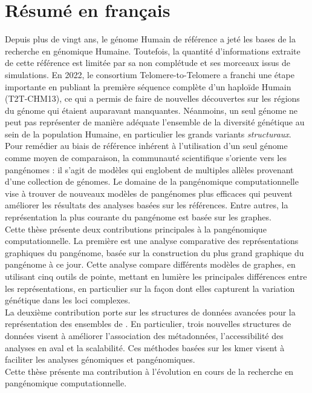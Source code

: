 \section{Résumé en français}
Depuis plus de vingt ans, le génome Humain de référence a jeté les bases de la recherche en génomique Humaine. Toutefois, la quantité d'informations extraite de cette référence est limitée par sa non complétude et ses morceaux issus de simulations. En 2022, le consortium Telomere-to-Telomere a franchi une étape importante en publiant la première séquence complète d'un haploïde Humain (T2T-CHM13), ce qui a permis de faire de nouvelles découvertes sur les régions du génome qui étaient auparavant manquantes. Néanmoins, un seul génome ne peut pas représenter de manière adéquate l'ensemble de la diversité génétique au sein de la population Humaine, en particulier les grands variants \emph{structuraux}.\\
Pour remédier au biais de référence inhérent à l'utilisation d'un seul génome comme moyen de comparaison, la communauté scientifique s'oriente vers les pangénomes : il s'agit de modèles qui englobent de multiples allèles provenant d'une collection de génomes. Le domaine de la pangénomique computationnelle vise à trouver de nouveaux modèles de pangénomes plus efficaces qui peuvent améliorer les résultats des analyses basées sur les références. Entre autres, la représentation la plus courante du pangénome est basée sur les graphes.\\
Cette thèse présente deux contributions principales à la pangénomique computationnelle. La première est une analyse comparative des représentations graphiques du pangénome, basée sur la construction du plus grand graphique du pangénome à ce jour. Cette analyse compare différents modèles de graphes, en utilisant cinq outils de pointe, mettant en lumière les principales différences entre les représentations, en particulier sur la façon dont elles capturent la variation génétique dans les loci complexes.\\
La deuxième contribution porte sur les structures de données avancées pour la représentation des ensembles de \kmer. En particulier, trois nouvelles structures de données visent à améliorer l'association des métadonnées, l'accessibilité des analyses en aval et la scalabilité. Ces méthodes basées sur les kmer visent à faciliter les analyses génomiques et pangénomiques.\\
Cette thèse présente ma contribution à l'évolution en cours de la recherche en pangénomique computationnelle.